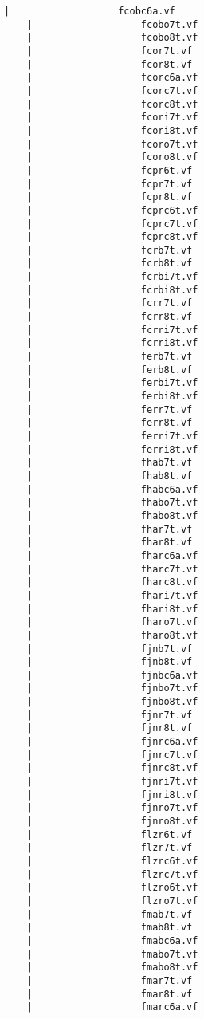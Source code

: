 \begin{lstlisting}[frame=tb, extendedchars=false, breaklines=false, basicstyle=\footnotesize\upshape ,columns=flexible ,keepspaces=true , lineskip={-7.0pt} ]
    |                   fcobc6a.vf
    |                   fcobo7t.vf
    |                   fcobo8t.vf
    |                   fcor7t.vf
    |                   fcor8t.vf
    |                   fcorc6a.vf
    |                   fcorc7t.vf
    |                   fcorc8t.vf
    |                   fcori7t.vf
    |                   fcori8t.vf
    |                   fcoro7t.vf
    |                   fcoro8t.vf
    |                   fcpr6t.vf
    |                   fcpr7t.vf
    |                   fcpr8t.vf
    |                   fcprc6t.vf
    |                   fcprc7t.vf
    |                   fcprc8t.vf
    |                   fcrb7t.vf
    |                   fcrb8t.vf
    |                   fcrbi7t.vf
    |                   fcrbi8t.vf
    |                   fcrr7t.vf
    |                   fcrr8t.vf
    |                   fcrri7t.vf
    |                   fcrri8t.vf
    |                   ferb7t.vf
    |                   ferb8t.vf
    |                   ferbi7t.vf
    |                   ferbi8t.vf
    |                   ferr7t.vf
    |                   ferr8t.vf
    |                   ferri7t.vf
    |                   ferri8t.vf
    |                   fhab7t.vf
    |                   fhab8t.vf
    |                   fhabc6a.vf
    |                   fhabo7t.vf
    |                   fhabo8t.vf
    |                   fhar7t.vf
    |                   fhar8t.vf
    |                   fharc6a.vf
    |                   fharc7t.vf
    |                   fharc8t.vf
    |                   fhari7t.vf
    |                   fhari8t.vf
    |                   fharo7t.vf
    |                   fharo8t.vf
    |                   fjnb7t.vf
    |                   fjnb8t.vf
    |                   fjnbc6a.vf
    |                   fjnbo7t.vf
    |                   fjnbo8t.vf
    |                   fjnr7t.vf
    |                   fjnr8t.vf
    |                   fjnrc6a.vf
    |                   fjnrc7t.vf
    |                   fjnrc8t.vf
    |                   fjnri7t.vf
    |                   fjnri8t.vf
    |                   fjnro7t.vf
    |                   fjnro8t.vf
    |                   flzr6t.vf
    |                   flzr7t.vf
    |                   flzrc6t.vf
    |                   flzrc7t.vf
    |                   flzro6t.vf
    |                   flzro7t.vf
    |                   fmab7t.vf
    |                   fmab8t.vf
    |                   fmabc6a.vf
    |                   fmabo7t.vf
    |                   fmabo8t.vf
    |                   fmar7t.vf
    |                   fmar8t.vf
    |                   fmarc6a.vf

\end{lstlisting}
